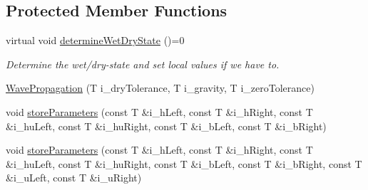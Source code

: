 \subsection*{Protected Member Functions}
\begin{DoxyCompactItemize}
\item 
virtual void \hyperlink{classsolver_1_1WavePropagation_accabfc2bea2eb577476d53c2117fd9d0}{determine\+Wet\+Dry\+State} ()=0
\begin{DoxyCompactList}\small\item\em Determine the wet/dry-\/state and set local values if we have to. \end{DoxyCompactList}\item 
\hyperlink{classsolver_1_1WavePropagation_ad99b3920e94402886323125e1bf39588}{Wave\+Propagation} (T i\+\_\+dry\+Tolerance, T i\+\_\+gravity, T i\+\_\+zero\+Tolerance)
\item 
void \hyperlink{classsolver_1_1WavePropagation_a1eed921157828ba1e5005e6f2c1709f7}{store\+Parameters} (const T \&i\+\_\+h\+Left, const T \&i\+\_\+h\+Right, const T \&i\+\_\+hu\+Left, const T \&i\+\_\+hu\+Right, const T \&i\+\_\+b\+Left, const T \&i\+\_\+b\+Right)
\item 
void \hyperlink{classsolver_1_1WavePropagation_a39e5490df673398dfb2f478b1b4b0d0e}{store\+Parameters} (const T \&i\+\_\+h\+Left, const T \&i\+\_\+h\+Right, const T \&i\+\_\+hu\+Left, const T \&i\+\_\+hu\+Right, const T \&i\+\_\+b\+Left, const T \&i\+\_\+b\+Right, const T \&i\+\_\+u\+Left, const T \&i\+\_\+u\+Right)
\end{DoxyCompactItemize}
